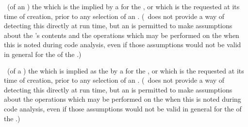  \Noun\ (of an )
  the  which is the 
  implied by a  for the , 
  or which is the requested  at its time 
  of creation, prior to any selection of an .
  (\clisp\ does not provide a way of detecting this 
   directly at run time, but an  is permitted 
   to make assumptions about the 's contents and
   the operations which may be performed on the  when
   this  is noted during code analysis, even if those 
   assumptions would not be valid in general for the
    of the
   .)
% 
%

 \Noun\ (of a )
  the  which is implied as the 
  by a  for the , 
  or which is the requested  at its time of
  creation, prior to any selection of an .
  (\clisp\ does not provide a way of detecting this 
   directly at run time, but an  is permitted 
   to make assumptions about the operations which may be performed on
   the  when this  is noted during code
   analysis, even if those assumptions would not be valid in general for 
   the  of the
   .)

